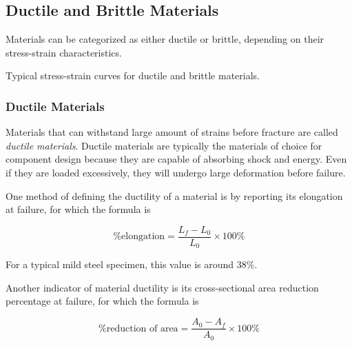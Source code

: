\documentclass[
fontsize=10pt,
a4paper,
twosides=false,
open=any,
svgnames,
]{kaobook} %
\begin{document}
\subsection{Ductile and Brittle Materials}

Materials can be categorized as either ductile or brittle, depending on their stress-strain characteristics.

\begin{marginfigure}
  \caption{Typical stress-strain curves for ductile and brittle materials.}
\end{marginfigure}

\subsubsection{Ductile Materials}

Materials that can withstand large amount of strains before fracture are called \emph{ductile materials}. Ductile materials are typically the materials of choice for component design because they are capable of absorbing shock and energy. Even if they are loaded excessively, they will undergo large deformation before failure.

One method of defining the ductility of a material is by reporting its elongation at failure, for which the formula is

\begin{equation}
  \text{\% elongation} = \frac{L_f - L_0}{L_0} \times 100\%
\end{equation}

For a typical mild steel specimen, this value is around 38\%.

Another indicator of material ductility is its cross-sectional area reduction percentage at failure, for which the formula is

\begin{equation}
  \text{\% reduction of area} = \frac{A_0 - A_f}{A_0} \times 100\%
\end{equation}
\end{document}
